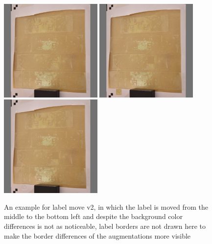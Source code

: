 \documentclass[10pt]{book}
\begin{document}
\begin{figure}
  \centering
     {\includegraphics[width=0.45\textwidth]{image/aug_lm2_before}}
     {\includegraphics[width=0.45\textwidth]{image/aug_lm2_after_old}}
     {\includegraphics[width=0.45\textwidth]{image/aug_lm2_after}}
  \caption{An example for label move v2, in which the label is moved from the middle to the bottom left and despite the background color differences is not as noticeable, label borders are not drawn here to make the border differences of the augmentations more visible}
  \label{fig:aug_lm2_example}
\end{figure}
\end{document}
